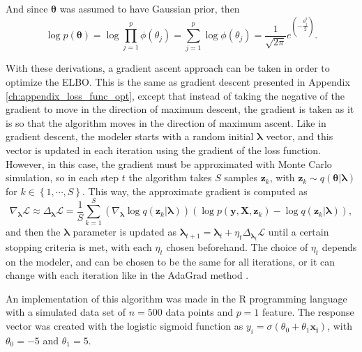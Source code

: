 And since $\boldsymbol{\theta}$ was assumed to have Gaussian prior, then
\begin{equation}
  \log p(\boldsymbol{\theta}) = \log \prod_{j = 1}^p \phi(\theta_j) = \sum_{j = 1}^p \log \phi(\theta_j) = \frac{1}{\sqrt{2 \pi}} e^{\left( -\frac{\theta_j^2}{2} \right)}.
\end{equation}

With these derivations, a gradient ascent approach can be taken in order to optimize the ELBO. This is the same as gradient descent presented in Appendix \ref{ch:appendix_loss_func_opt}, except that instead of taking the negative of the gradient to move in the direction of maximum descent, the gradient is taken as it is so that the algorithm moves in the direction of maximum ascent. Like in gradient descent, the modeler starts with a random initial $\boldsymbol{\lambda}$ vector, and this vector is updated in each iteration using the gradient of the loss function. However, in this case, the gradient must be approximated with Monte Carlo simulation, so in each step $t$ the algorithm takes $S$ samples $\boldsymbol{z}_k$, with $\boldsymbol{z}_k \sim q(\boldsymbol{\theta} | \boldsymbol{\lambda})$ for $k \in \left\{1, \cdots, S \right\}$. This way, the approximate gradient is computed as
\begin{equation}
  \nabla_{\boldsymbol{\lambda}} \mathcal{L} \approx \Delta_{\boldsymbol{\lambda}} \mathcal{L} = \frac{1}{S} \sum_{k = 1}^S \left( \nabla_{\boldsymbol{\lambda}} \log q(\boldsymbol{z}_k | \boldsymbol{\lambda}) \right) \left( \log p(\boldsymbol{y}, \boldsymbol{X}, \boldsymbol{z}_k) - \log q(\boldsymbol{z}_k | \boldsymbol{\lambda}) \right),
\end{equation}
and then the $\boldsymbol{\lambda}$ parameter is updated as $\boldsymbol{\lambda}_{t+1} = \boldsymbol{\lambda}_{t} + \eta_t  \Delta_{\boldsymbol{\lambda}_t} \mathcal{L}$ until a certain stopping criteria is met, with each $\eta_t$ chosen beforehand. The choice of $\eta_t$ depends on the modeler, and can be chosen to be the same for all iterations, or it can change with each iteration like in the AdaGrad method \cite{duchi2011adaptive}.

An implementation of this algorithm was made in the R programming language with a simulated data set of $n = 500$ data points and $p = 1$ feature. The response vector was created with the logistic sigmoid function as $y_i = \sigma(\theta_0 + \theta_1 \boldsymbol{x_i})$, with $\theta_0 = -5$ and $\theta_1 = 5$.


